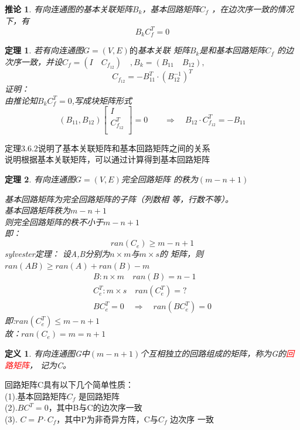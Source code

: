 \documentclass[11pt,a4paper,openany]{book}
\newcommand{\song}{\CJKfamily{song}}
\newtheorem{theorem}{\textbf{定理}}[section]
\newtheorem{defination}{\textbf{定义}}[section]
\newtheorem{coro}{\textbf{推论}}[section]
\begin{document}
\begin{coro}
有向连通图的基本关联矩阵$B_k$，基本回路矩阵$C_f$ ，在边次序一致的情况下，有$$B_kC_f^T=0$$
\end{coro}
\begin{theorem}
若有向连通图$G=(V,E)的$基本关联
矩阵$B_k$是和基本回路矩阵$C_f$ 的边次序一致，并设$C_f=(I \quad C_{f_{12}}) \quad ,B_k=(B_{11} \quad B_{12}),$
$$ C_{f_{12}}=-B_{11}^T\cdot(B_{12}^{-1})^T$$
{\song
证明：\\
由推论知$B_kC^T_f=0$,写成块矩阵形式
\begin{equation*}
(B_{11},B_{12})\left[
                 \begin{array}{c}
                   I \\
                   C_{f_{12}}^T \\
                 \end{array}
               \right]=0\quad \quad \Rightarrow \quad B_{12}\cdot  C_{f_{12}}^T=-B_{11}
\end{equation*}
}
\end{theorem}
\begin{shaded}
定理$3.6.2$说明了基本关联矩阵和基本回路矩阵之间的关系\\
\indent 说明根据基本关联矩阵，可以通过计算得到基本回路矩阵
\end{shaded}
\begin{theorem}
有向连通图$G=(V,E)$完全回路矩阵
的秩为$(m-n+1)$\\
{\song
基本回路矩阵为完全回路矩阵的子阵（列数相
等，行数不等）。\\
基本回路矩阵秩为$m-n+1$\\
则完全回路矩阵的秩不小于$m-n+1$\\
即：$$ran(C_e)\geq m-n+1$$
sylvester定理： 设A,B分别为$n\times m$与$m\times s$的
矩阵，则$ran (AB) \geq ran (A)+ran (B)-m$
\begin{gather*}
                                       B:n\times m \quad ran(B)=n-1 \\
                                       C_e^T:m \times s \quad ran(C_e^T)=?\\
                                       BC_e^T=0 \quad \Rightarrow \quad ran(BC_e^T)=0
                                     \end{gather*}
 即:$ran(C_e^T)\leq m-n+1$\\
 故：$ran(C_e)=m=n+1$

}
\end{theorem}
\begin{defination}
有向连通图G中$(m-n+1)$个互相独立的回路组成的矩阵，称为G的\textcolor{red}{回路矩阵}，
记为C。
\end{defination}
\begin{shaded}
\noindent 回路矩阵C具有以下几个简单性质：\\
(1).基本回路矩阵$C_f$ 是回路矩阵\\
(2).$BC^T=0$，其中B与C的边次序一致\\
(3). $C=P\cdot C_f$，其中P为非奇异方阵，C与$C_f$ 边次序
一致
\end{shaded}
\end{document}
